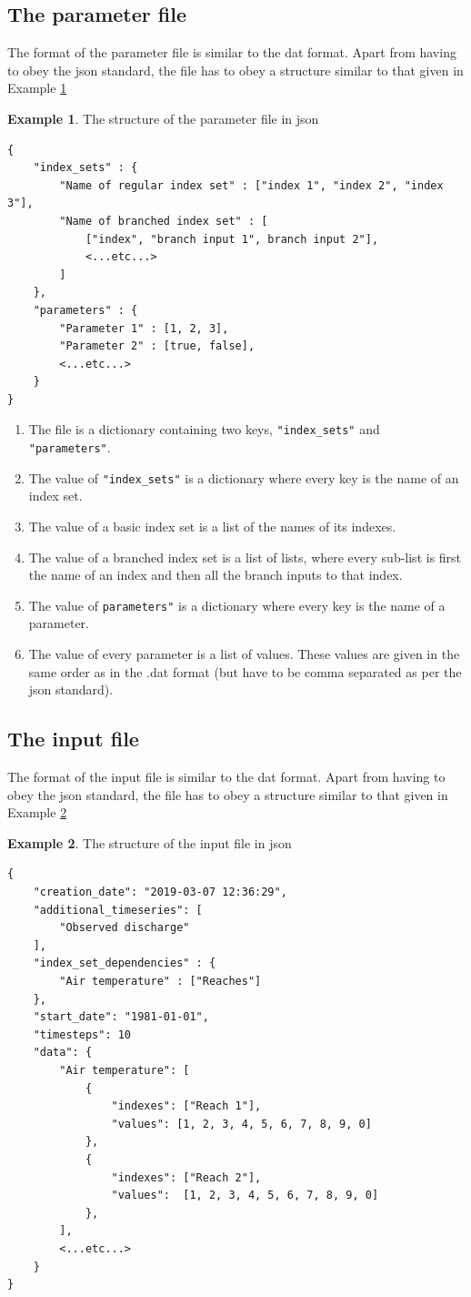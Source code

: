 \documentclass[11pt]{article}
\theoremstyle{definition}
\newtheorem{myexample}{Example}
\newenvironment{example}%
  {\begin{lrbox}{\examplebox}%
   \begin{minipage}{\dimexpr\linewidth-2\fboxsep}
   \begin{myexample}}%
  {\end{myexample}%
   \end{minipage}%
   \end{lrbox}%
   \begin{trivlist}
     \item[]\colorbox{silver}{\usebox\examplebox}
   \end{trivlist}}
\begin{document}
\subsection{The parameter file}
The format of the parameter file is similar to the dat format. Apart from having to obey the json standard, the file has to obey a structure similar to that given in Example \ref{ex:jsonpar}

\begin{example}\label{ex:jsonpar}
The structure of the parameter file in json
\begin{lstlisting}
{
	"index_sets" : {
		"Name of regular index set" : ["index 1", "index 2", "index 3"],
		"Name of branched index set" : [
			["index", "branch input 1", branch input 2"],
			<...etc...>
		]
	},
	"parameters" : {
		"Parameter 1" : [1, 2, 3],
		"Parameter 2" : [true, false],
		<...etc...>
	}
}
\end{lstlisting}
\end{example}

\begin{enumerate}[i]
\item The file is a dictionary containing two keys, {\tt "index\_sets"} and {\tt "parameters"}.
\item The value of {\tt "index\_sets"} is a dictionary where every key is the name of an index set.
\item The value of a basic index set is a list of the names of its indexes.
\item The value of a branched index set is a list of lists, where every sub-list is first the name of an index and then all the branch inputs to that index.
\item The value of {\tt parameters"} is a dictionary where every key is the name of a parameter.
\item The value of every parameter is a list of values. These values are given in the same order as in the .dat format (but have to be comma separated as per the json standard).
\end{enumerate}

\subsection{The input file}
The format of the input file is similar to the dat format. Apart from having to obey the json standard, the file has to obey a structure similar to that given in Example \ref{ex:jsonin}

\begin{example}\label{ex:jsonin}
The structure of the input file in json
\begin{lstlisting}
{
	"creation_date": "2019-03-07 12:36:29",
	"additional_timeseries": [
		"Observed discharge"
	],
	"index_set_dependencies" : {
		"Air temperature" : ["Reaches"]
	},
	"start_date": "1981-01-01",
	"timesteps": 10
	"data": {
		"Air temperature": [
			{
				"indexes": ["Reach 1"],
				"values": [1, 2, 3, 4, 5, 6, 7, 8, 9, 0]
			},
			{
				"indexes": ["Reach 2"],
				"values":  [1, 2, 3, 4, 5, 6, 7, 8, 9, 0]
			},
		],
		<...etc...>
	}
}
\end{lstlisting}
\end{example}
\end{document}
